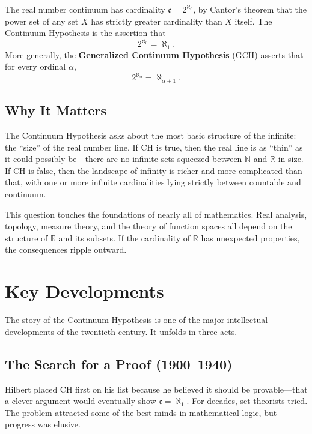 The real number continuum has cardinality $\mathfrak{c} = 2^{\aleph_0}$, by Cantor's theorem that the power set of any set $X$ has strictly greater cardinality than $X$ itself. The Continuum Hypothesis is the assertion that
\[
    2^{\aleph_0} = \aleph_1.
\]
More generally, the \textbf{Generalized Continuum Hypothesis} (GCH) asserts that for every ordinal $\alpha$,
\[
    2^{\aleph_\alpha} = \aleph_{\alpha+1}.
\]

\subsection{Why It Matters}

The Continuum Hypothesis asks about the most basic structure of the infinite: the ``size'' of the real number line. If CH is true, then the real line is as ``thin'' as it could possibly be---there are no infinite sets squeezed between $\mathbb{N}$ and $\mathbb{R}$ in size. If CH is false, then the landscape of infinity is richer and more complicated than that, with one or more infinite cardinalities lying strictly between countable and continuum.

This question touches the foundations of nearly all of mathematics. Real analysis, topology, measure theory, and the theory of function spaces all depend on the structure of $\mathbb{R}$ and its subsets. If the cardinality of $\mathbb{R}$ has unexpected properties, the consequences ripple outward.

\section{Key Developments}

The story of the Continuum Hypothesis is one of the major intellectual developments of the twentieth century. It unfolds in three acts.

\subsection{The Search for a Proof (1900--1940)}

Hilbert placed CH first on his list because he believed it should be provable---that a clever argument would eventually show $\mathfrak{c} = \aleph_1$. For decades, set theorists tried. The problem attracted some of the best minds in mathematical logic, but progress was elusive.

